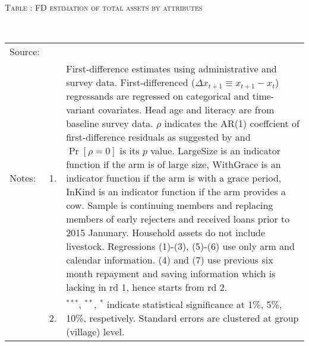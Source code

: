 \hspace{-1cm}\begin{minipage}[t]{14cm}
\hfil\textsc{\normalsize Table \thetable: FD estimation of total assets by attributes\label{tab FD total assets attributes original HHs}}\\
\setlength{\tabcolsep}{1pt}
\setlength{\baselineskip}{8pt}
\renewcommand{\arraystretch}{.55}
\hfil{}\\
\renewcommand{\arraystretch}{.8}
\setlength{\tabcolsep}{1pt}
\begin{tabular}{>{\hfill\scriptsize}p{1cm}<{}>{\hfill\scriptsize}p{.25cm}<{}>{\scriptsize}p{12cm}<{\hfill}}
Source:& \multicolumn{2}{l}{\scriptsize Estimated with GUK administrative and survey data.}\\
Notes: & 1. & First-difference estimates using administrative and survey data. First-differenced ($\Delta x_{t+1}\equiv x_{t+1} - x_{t}$) regressands are regressed on categorical and time-variant covariates. Head age and literacy are from baseline survey data. $\rho$ indicates the AR(1) coeffcient of first-difference residuals as suggested by \citet[][10.71]{Wooldridge2010} and $\Pr[\rho=0]$ is its $p$ value. \textsf{LargeSize} is an indicator function if the arm is of large size, \textsf{WithGrace} is an indicator function if the arm is with a grace period, \textsf{InKind} is an indicator function if the arm provides a cow. Sample is continuing members and replacing members of early rejecters and received loans prior to 2015 Janunary. Household assets do not include livestock. Regressions (1)-(3), (5)-(6) use only arm and calendar information. (4) and (7) use previous six month repayment and saving information which is lacking in rd 1, hence starts from rd 2.\\
& 2. & ${}^{***}$, ${}^{**}$, ${}^{*}$ indicate statistical significance at 1\%, 5\%, 10\%, respetively. Standard errors are clustered at group (village) level.
\end{tabular}
\end{minipage}


